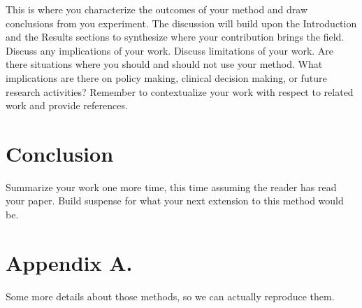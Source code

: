 \documentclass[twoside,11pt]{article}
\begin{document}
This is where you characterize the outcomes of your method and draw conclusions from you experiment.
The discussion will build upon the Introduction and the Results sections to synthesize where your contribution brings the field. Discuss any implications of your work. 
Discuss limitations of your work.
Are there situations where you should and should not use your method.
What implications are there on policy making, clinical decision making, or future research activities?
Remember to contextualize your work with respect to related work and provide references.

\section{Conclusion} 
Summarize your work one more time, this time assuming the reader has read your paper.
Build suspense for what your next extension to this method would be.




\appendix
\section*{Appendix A.}
Some more details about those methods, so we can actually reproduce them.
\end{document}
